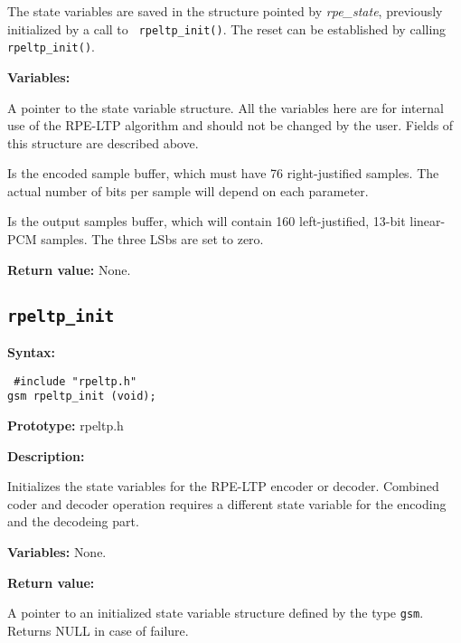         The state variables are saved in the structure pointed by {\em
        rpe\_state}, previously initialized by a call to {\tt
        rpeltp\_init()}. The reset can be established by calling {\tt
        rpeltp\_init()}.

{\bf Variables: }
\begin{Descr}{\DescrLen}
\item[\pbox{20mm}{\em rpe\_state}] %
               A pointer to the state variable structure. All the
               variables here are for internal use of the RPE-LTP
               algorithm and should not be changed by the user. Fields
               of this structure are described above.

\item[\pbox{20mm}{\em rpe\_frame}] %
               Is the encoded sample buffer, which must have 76
               right-justified \short samples. The actual number of
               bits per sample will depend on each parameter.

\item[\pbox{20mm}{\em out\_buf}] %
               Is the output samples buffer, which will contain 160
               left-justified, 13-bit linear-PCM \short samples. The
               three LSbs are set to zero.
\end{Descr}

        {\bf Return value: }        None.

\subsection{{\tt rpeltp\_init}}

{\bf Syntax: }

{\tt
\#include "rpeltp.h"\\
gsm rpeltp\_init (void);
}

{\bf Prototype: }    rpeltp.h

{\bf Description: }

        Initializes the state variables for the RPE-LTP encoder or decoder.
        Combined coder and decoder operation requires a different state
        variable for the encoding and the decodeing part.

{\bf Variables: } None.

{\bf Return value: }

A pointer to an initialized state variable structure defined by the type
{\tt gsm}. Returns NULL in case of failure.

